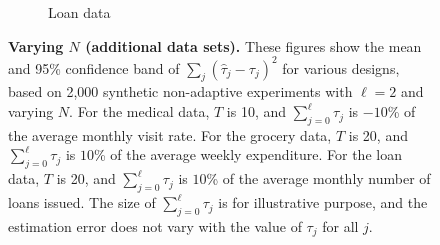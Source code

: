 \begin{figure}[H]
\begin{subfigure}{1\textwidth}
		\caption{Loan data}
	\end{subfigure}
	\caption{\textbf{Varying $N$ (additional data sets).} These figures show the mean and 95\% confidence band of $\sum_{j}(\hat{\tau}_j - \tau_j)^2$ for various designs, based on 2,000 synthetic non-adaptive experiments with $\ell = 2$ and varying $N$. For the medical data, $T$ is 10, and $\sum_{j= 0}^\ell \tau_j$ is $-10$\% of the average monthly visit rate. For the grocery data, $T$ is 20, and $\sum_{j= 0}^\ell \tau_j$ is $10$\% of the average weekly expenditure. For the loan data, $T$ is 20, and $\sum_{j= 0}^\ell \tau_j$ is $10$\% of the average monthly number of loans issued. The size of $\sum_{j= 0}^\ell \tau_j$ is for illustrative purpose, and the estimation error does not vary with the value of $\tau_j$ for all $j$.}
	\label{fig:additional-varying-N}
\end{figure}

